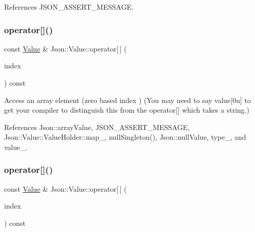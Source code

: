 References J\+S\+O\+N\+\_\+\+A\+S\+S\+E\+R\+T\+\_\+\+M\+E\+S\+S\+A\+GE.

\mbox{\label{classJson_1_1Value_a46607236038b29695ed80c15895271e4_a46607236038b29695ed80c15895271e4}} 
\subsubsection{\texorpdfstring{operator[]()}{operator[]()}\hspace{0.1cm}{\footnotesize\ttfamily [3/9]}}
{\footnotesize\ttfamily const \hyperlink{classJson_1_1Value}{Value} \& Json\+::\+Value\+::operator\mbox{[}$\,$\mbox{]} (\begin{DoxyParamCaption}\item[{\hyperlink{classJson_1_1Value_a184a91566cccca7b819240f0d5561c7d_a184a91566cccca7b819240f0d5561c7d}{Array\+Index}}]{index }\end{DoxyParamCaption}) const}

Access an array element (zero based index ) (You may need to say \textquotesingle{}value\mbox{[}0u\mbox{]}\textquotesingle{} to get your compiler to distinguish this from the operator\mbox{[}\mbox{]} which takes a string.) 

References Json\+::array\+Value, J\+S\+O\+N\+\_\+\+A\+S\+S\+E\+R\+T\+\_\+\+M\+E\+S\+S\+A\+GE, Json\+::\+Value\+::\+Value\+Holder\+::map\+\_\+, null\+Singleton(), Json\+::null\+Value, type\+\_\+, and value\+\_\+.

\mbox{\label{classJson_1_1Value_a0b42557a95621a4676b46a21ffc5e949_a0b42557a95621a4676b46a21ffc5e949}} 
\subsubsection{\texorpdfstring{operator[]()}{operator[]()}\hspace{0.1cm}{\footnotesize\ttfamily [4/9]}}
{\footnotesize\ttfamily const \hyperlink{classJson_1_1Value}{Value} \& Json\+::\+Value\+::operator\mbox{[}$\,$\mbox{]} (\begin{DoxyParamCaption}\item[{int}]{index }\end{DoxyParamCaption}) const}

